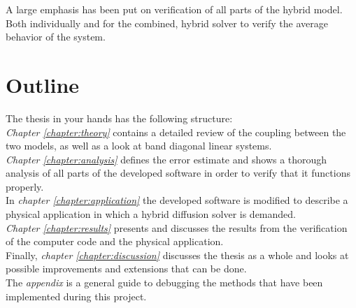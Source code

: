 \noindent A large emphasis has been put on verification of all parts of the hybrid model. 
Both individually and for the combined, hybrid solver to verify the average behavior of the system.\\

\section{Outline}
\noindent The thesis in your hands has the following structure: \\

\noindent \emph{Chapter \ref{chapter:theory}} contains a detailed review of the coupling between the two models, as well as a look at band diagonal linear systems. \\

\noindent \emph{Chapter \ref{chapter:analysis}} defines the error estimate and shows a thorough analysis of all parts of the developed software in order to verify that it functions properly. \\

\noindent In \emph{chapter \ref{chapter:application}} the developed software is modified to describe a physical application in which a hybrid diffusion solver is demanded. \\

\noindent \emph{Chapter \ref{chapter:results}} presents and discusses the results from the verification of the computer code and the physical application. \\

\noindent Finally, \emph{chapter \ref{chapter:discussion}} discusses the thesis as a whole and looks at possible improvements and extensions that can be done. \\

\noindent The \emph{appendix} is a general guide to debugging the methods that have been implemented during this project.